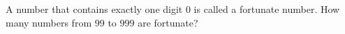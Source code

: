 A number that contains exactly one digit $0$ is called a fortunate number. How many numbers from $99$ to $999$ are fortunate?
